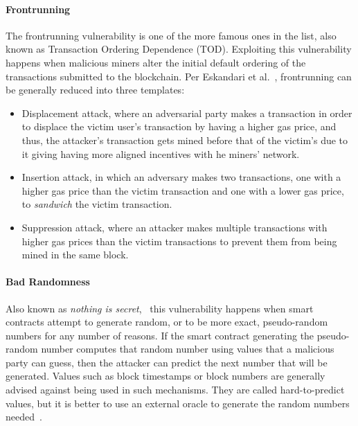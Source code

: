             \paragraph{Frontrunning}
            The frontrunning vulnerability is one of the more famous ones in the list, also known as Transaction Ordering Dependence (TOD).
            Exploiting this vulnerability happens when malicious miners alter the initial default ordering of the transactions submitted to the blockchain.
            Per Eskandari et al.~\cite{eskandari2018frontrunning}, frontrunning can be generally reduced into three templates:
            \begin{itemize}
                \item Displacement attack, where an adversarial party makes a transaction in order to displace the victim user's transaction by having a higher gas price, and thus, the attacker's transaction gets mined before that of the victim's due to it giving having more aligned incentives with he miners' network.
                \item Insertion attack, in which an adversary makes two transactions, one with a higher gas price than the victim transaction and one with a lower gas price, to \textit{sandwich} the victim transaction.~\cite{varun2022mitigating}
                \item Suppression attack, where an attacker makes multiple transactions with higher gas prices than the victim transactions to prevent them from being mined in the same block.
            \end{itemize}

            \paragraph{Bad Randomness}
            Also known as \textit{nothing is secret},~\cite{dasp} this vulnerability happens when smart contracts attempt to generate random, or to be more exact, pseudo-random numbers for any number of reasons.
            If the smart contract generating the pseudo-random number computes that random number using values that a malicious party can guess, then the attacker can predict the next number that will be generated.
            Values such as block timestamps or block numbers are generally advised against being used in such mechanisms. They are called hard-to-predict values, but it is better to use an external oracle to generate the random numbers needed~\cite{swcregistry}.
        
